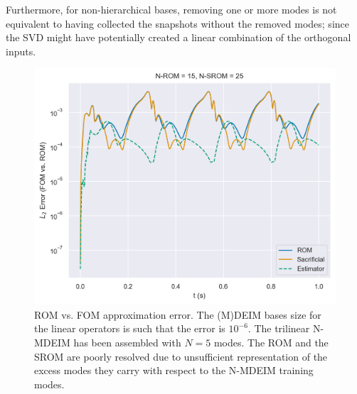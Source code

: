 \documentclass[../../thesis.tex]{subfiles}
\begin{document}
Furthermore, for non-hierarchical bases, removing one or more modes is not equivalent
to having collected the snapshots without the removed modes; 
since the SVD might have potentially created a linear combination of the orthogonal inputs.

\newpage
\begin{figure}[h]
    \includegraphics[width =\columnwidth]{research_project/piston/figures/nonlinear_displacement/arbitrary/error_estimation_rom_15_srom_25_modes_5.png}
    \caption{ROM vs. FOM approximation error.
    The (M)DEIM bases size for the linear operators is such that the error is $10^{-6}$.
    The trilinear N-MDEIM has been assembled with $N=5$ modes.
    The ROM and the SROM are poorly resolved due to unsufficient representation of the excess
    modes they carry with respect to the N-MDEIM training modes.}
    \label{fig:nlinear_disp_modes_5_rom_15}
\end{figure}
\end{document}
